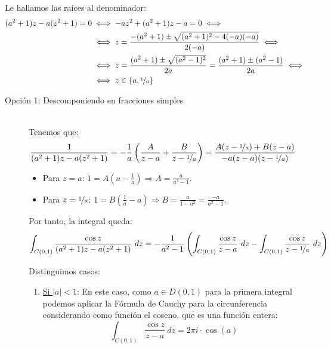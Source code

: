 \begin{ejercicio}
\begin{enumerate}
        Le hallamos las raíces al denominador:
        \begin{align*}
            (a^2+1)z - a(z^2+1) = 0 &\iff -az^2 + (a^2+1)z - a=0\iff\\&\iff z=
            \frac{-(a^2+1)\pm\sqrt{(a^2+1)^2-4(-a)(-a)}}{2(-a)} \iff\\
            &\iff z=\frac{(a^2+1)\pm\sqrt{(a^2-1)^2}}{2a} = \frac{(a^2+1)\pm(a^2-1)}{2a} \iff\\
            &\iff z\in \left\{a,\nicefrac{1}{a}\right\}
        \end{align*}
        
        \begin{description}
            \item [Opción 1: Descomponiendo en fracciones simples]~\\
                Tenemos que:
                \begin{align*}
                    \frac{1}{(a^2+1)z - a(z^2+1)} &= -\dfrac{1}{a}\left(\frac{A}{z-a} + \frac{B}{z-\nicefrac{1}{a}}\right) = \frac{A(z-\nicefrac{1}{a}) + B(z-a)}{-a(z-a)(z-\nicefrac{1}{a})}
                \end{align*}
                \begin{itemize}
                    \item Para $z=a$: $1=A\left(a-\frac{1}{a}\right)\Longrightarrow A=\frac{a}{a^2-1}$.
                    \item Para $z=\nicefrac{1}{a}$: $1=B\left(\frac{1}{a}-a\right)\Longrightarrow B=\frac{a}{1-a^2}=\frac{-a}{a^2-1}$.
                \end{itemize}

                Por tanto, la integral queda:
                \begin{align*}
                    \int_{C(0,1)} \frac{\cos z}{(a^2+1)z - a(z^2+1)}\ dz &= -\frac{1}{a^2-1}\left(\int_{C(0,1)} \frac{\cos z}{z-a}\ dz-\int_{C(0,1)} \frac{\cos z}{z-\nicefrac{1}{a}}\ dz\right)\\
                \end{align*}

                Distinguimos casos:
                \begin{enumerate}
                    \item \ul{Si $|a|<1$}: En este caso, como $a\in D(0,1)$ para la primera integral podemos aplicar la Fórmula de Cauchy para la circunferencia considerando como función el coseno, que es una función entera:
                    \begin{equation*}
                        \int_{C(0,1)} \frac{\cos z}{z-a}\ dz = 2\pi i \cdot \cos(a)
                    \end{equation*}


\end{enumerate}
\end{description}
\end{enumerate}
\end{ejercicio}
